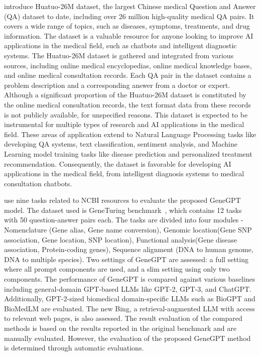\citet{li2023huatuo} introduce Huatuo-26M dataset, the largest Chinese medical Question and Answer (QA) dataset to date, including over 26 million high-quality medical QA pairs. It covers a wide range of topics, such as diseases, symptoms, treatments, and drug information. The dataset is a valuable resource for anyone looking to improve AI applications in the medical field, such as chatbots and intelligent diagnostic systems.
The Huatuo-26M dataset is gathered and integrated from various sources, including online medical encyclopedias, online medical knowledge bases, and online medical consultation records. Each QA pair in the dataset contains a problem description and a corresponding answer from a doctor or expert. Although a significant proportion of the Huatuo-26M dataset is constituted by the online medical consultation records, the text format data from these records is not publicly available, for unspecified reasons.
This dataset is expected to be instrumental for multiple types of research and AI applications in the medical field. These areas of application extend to Natural Language Processing tasks like developing QA systems, text classification, sentiment analysis, and Machine Learning model training tasks like disease prediction and personalized treatment recommendation. Consequently, the dataset is favorable for developing AI applications in the medical field, from intelligent diagnosis systems to medical consultation chatbots.

\citet{jin2023genegpt} use nine tasks related to NCBI resources to evaluate the proposed GeneGPT model. The dataset used is GeneTuring benchmark~\cite{Hou2023GeneTuring}, which contains 12 tasks with 50 question-answer pairs each. The tasks are divided into four modules - Nomenclature  (Gene alias, Gene name conversion),  Genomic location(Gene SNP association, Gene location, SNP location), 
  Functional analysis(Gene disease association, Protein-coding genes), 
  Sequence alignment (DNA to human genome, DNA to multiple species). Two settings of GeneGPT are assessed: a full setting where all prompt components are used, and a slim setting using only two components. The performance of GeneGPT is compared against various baselines including general-domain GPT-based LLMs like GPT-2, GPT-3, and ChatGPT. Additionally, GPT-2-sized biomedical domain-specific LLMs such as BioGPT and BioMedLM are evaluated. The new Bing, a retrieval-augmented LLM with access to relevant web pages, is also assessed. The result evaluation of the compared methods is based on the results reported in the original benchmark and are manually evaluated. However, the evaluation of the proposed GeneGPT method is determined through automatic evaluations.





